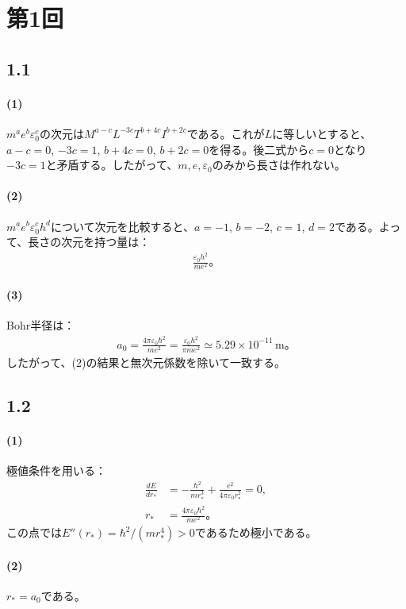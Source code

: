 \documentclass[platex,dvipdfmx,a4paper]{jsarticle}
\newcommand{\bbn}[2]{\frac{d #1}{d #2}}
\begin{document}
\section*{第1回}
\subsection*{1.1}
\paragraph{(1)} $m^a e^b\varepsilon_0^c$の次元は$M^{a-c}L^{-3c}T^{b+4c}I^{b+2c}$である。これが$L$に等しいとすると、$a-c=0$, $-3c=1$, $b+4c=0$, $b+2c=0$を得る。後二式から$c=0$となり$-3c=1$と矛盾する。したがって、$m,e,\varepsilon_0$のみから長さは作れない。
\paragraph{(2)} $m^a e^b\varepsilon_0^c h^d$について次元を比較すると、$a=-1$, $b=-2$, $c=1$, $d=2$である。よって、長さの次元を持つ量は：
\begin{align*}
 \frac{\varepsilon_0h^2}{me^2}。
\end{align*}
\paragraph{(3)} Bohr半径は：
\begin{align*}
 a_0=\frac{4\pi\varepsilon_0\hbar^2}{me^2}=\frac{\varepsilon_0h^2}{\pi me^2}\simeq5.29\times10^{-11}\,\mathrm{m}。
\end{align*}
したがって、(2)の結果と無次元係数を除いて一致する。
\subsection*{1.2}
\paragraph{(1)} 極値条件を用いる：
\begin{align*}
 \bbn{E}{r_*}&=-\frac{\hbar^2}{mr_*^3}+\frac{e^2}{4\pi\varepsilon_0r_*^2}=0,\\
 r_*&=\frac{4\pi\varepsilon_0\hbar^2}{me^2}。
\end{align*}
この点では$E''(r_*)=\hbar^2/(mr_*^4)>0$であるため極小である。
\paragraph{(2)} $r_*=a_0$である。
\end{document}
